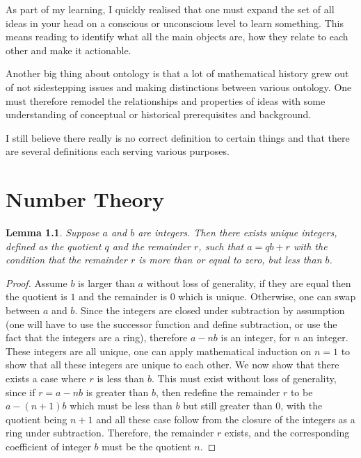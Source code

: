 \documentclass{tufte-book}
\newtheorem{lemma}[theorem]{Lemma}
\begin{document}
As part of my learning, I quickly realised that one must expand the set of all ideas in your head on a conscious or unconscious level to learn something. This means reading to identify what all the main objects are, how they relate to each other and make it actionable.

Another big thing about ontology is that a lot of mathematical history grew out of not sidestepping issues and making distinctions between various ontology. One must therefore remodel the relationships and properties of ideas with some understanding of conceptual or historical prerequisites and background.

I still believe there really is no correct definition to certain things and that there are several definitions each serving various purposes.

\chapter{Number Theory}

\begin{lemma}
  Suppose $a$ and $b$ are integers. Then there exists unique integers, defined as the quotient $q$ and the remainder $r$, such that $a = qb + r$ with the condition that the remainder $r$ is more than or equal to zero, but less than $b$.
\end{lemma}

\begin{proof}
  Assume $b$ is larger than $a$ without loss of generality, if they are equal then the quotient is $1$ and the remainder is $0$ which is unique. Otherwise, one can swap between $a$ and $b$.
  Since the integers are closed under subtraction by assumption (one will have to use the successor function and define subtraction, or use the fact that the integers are a ring), therefore $a - nb$ is an integer, for $n$ an integer. These integers are all unique, one can apply mathematical induction on $n = 1$ to show that all these integers are unique to each other. We now show that there exists a case where $r$ is less than $b$. This must exist without loss of generality, since if $r = a - nb$ is greater than $b$, then redefine the remainder $r$ to be $a - (n+1)b$ which must be less than $b$ but still greater than $0$, with the quotient being $n+1$ and all these case follow from the closure of the integers as a ring under subtraction. Therefore, the remainder $r$ exists, and the corresponding coefficient of integer $b$ must be the quotient $n$.
\end{proof}
\end{document}
